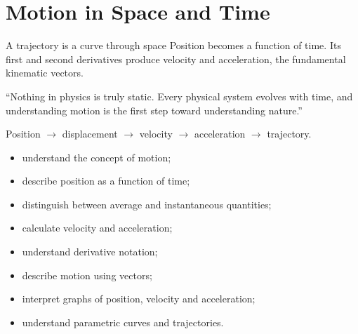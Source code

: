 \chapter{Motion in Space and Time}
\chapteropeningart
{A trajectory is a curve through space}
{Position becomes a function of time. Its first and second derivatives produce
velocity and acceleration, the fundamental kinematic vectors.}

\chapterquote
{``Nothing in physics is truly static. Every physical system evolves with time,
and understanding motion is the first step toward understanding nature.''}
{}

\begin{roadmapbox}
Position $\longrightarrow$ displacement $\longrightarrow$ velocity
$\longrightarrow$ acceleration $\longrightarrow$ trajectory.
\end{roadmapbox}


\learningobjectives


\begin{itemize}
	\item understand the concept of motion;
	\item describe position as a function of time;
	\item distinguish between average and instantaneous quantities;
	\item calculate velocity and acceleration;
	\item understand derivative notation;
	\item describe motion using vectors;
	\item interpret graphs of position, velocity and acceleration;
	\item understand parametric curves and trajectories.
\end{itemize}

\newpage
















